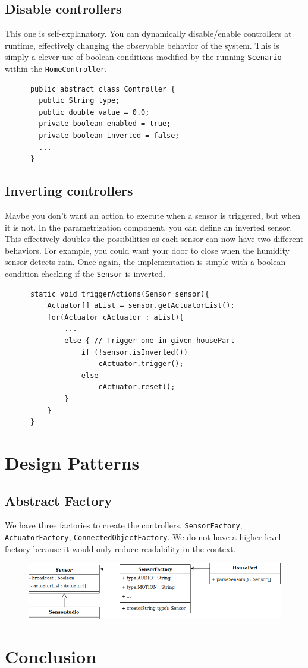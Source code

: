     \subsection{Disable controllers}
      This one is self-explanatory. You can dynamically disable/enable controllers at runtime, effectively changing the observable behavior of the system. This is simply a clever use of boolean conditions modified by the running \texttt{Scenario} within the \texttt{HomeController}.
      \begin{verbatim}
      public abstract class Controller {
        public String type;
        public double value = 0.0;
        private boolean enabled = true;
        private boolean inverted = false;
        ...
      }
      \end{verbatim}

    \subsection{Inverting controllers}
      Maybe you don't want an action to execute when a sensor is triggered, but when it is not. In the parametrization component, you can define an inverted sensor. This effectively doubles the possibilities as each sensor can now have two different behaviors. For example, you could want your door to close when the humidity sensor detects rain. Once again, the implementation is simple with a boolean condition checking if the \texttt{Sensor} is inverted.
      \begin{verbatim}
      static void triggerActions(Sensor sensor){
          Actuator[] aList = sensor.getActuatorList();
          for(Actuator cActuator : aList){
              ...
              else { // Trigger one in given housePart
                  if (!sensor.isInverted())
                      cActuator.trigger();
                  else
                      cActuator.reset();
              }
          }
      }
      \end{verbatim}

  \section{Design Patterns}
    \subsection{Abstract Factory}
      We have three factories to create the controllers. \texttt{SensorFactory}, \texttt{ActuatorFactory}, \texttt{ConnectedObjectFactory}. We do not have a higher-level factory because it would only reduce readability in the context.
      \begin{figure}[!h]
        \includegraphics[width=\textwidth]{sensorfactory.png}
      \end{figure}

	\section{Conclusion}


